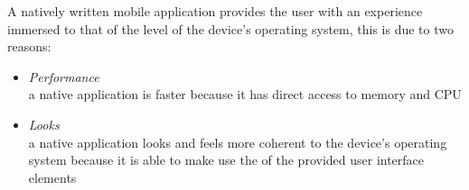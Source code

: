 A natively written mobile application provides the user with an experience immersed to that of the level of the device's operating system, this is due to two reasons:
\begin{itemize}
\item
\emph{Performance}\\
a native application is faster because it has direct access to memory and CPU
\item \emph{Looks}\\
a native application looks and feels more coherent to the device's operating system because it is able to make use the of the provided user interface elements
\end{itemize}